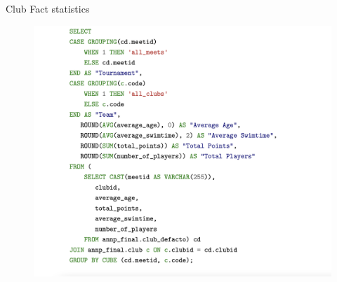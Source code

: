 \documentclass[aspectratio=169, xcolor=dvipsnames]{beamer}
\begin{document}
\begin{frame}{Club Fact statistics}

\begin{figure}
    \includegraphics[scale=0.2]{img/clubs-stats-all.png}\hspace*{10cm}
\end{figure}

\end{frame}
\end{document}
